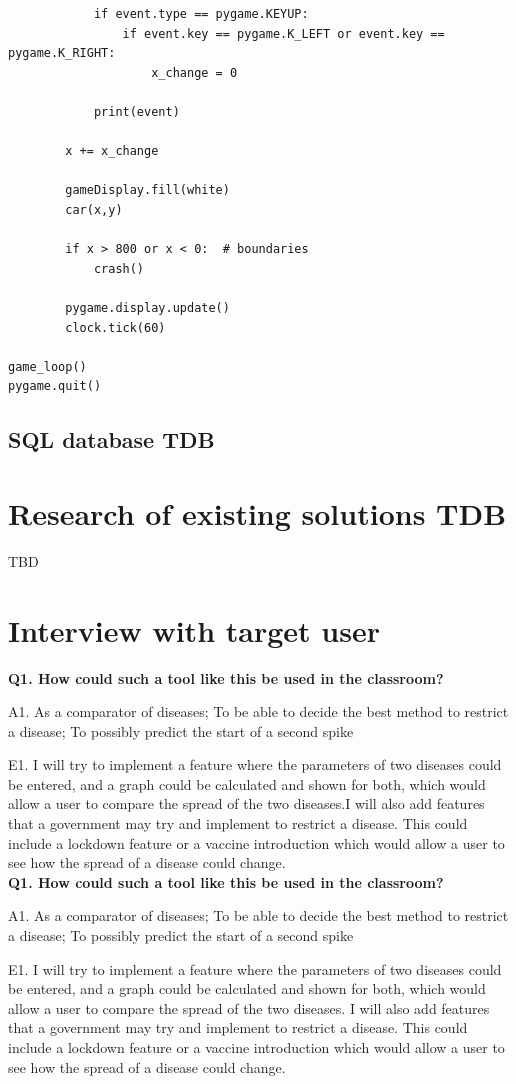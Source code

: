 \documentclass[11pt, a4paper]{article}
\begin{document}
\begin{lstlisting}
            if event.type == pygame.KEYUP:
                if event.key == pygame.K_LEFT or event.key == pygame.K_RIGHT:
                    x_change = 0

            print(event)

        x += x_change

        gameDisplay.fill(white)
        car(x,y)

        if x > 800 or x < 0:  # boundaries
            crash()

        pygame.display.update()
        clock.tick(60)

game_loop()
pygame.quit()
\end{lstlisting}


\subsection{SQL database TDB}

\newpage
\section{Research of existing solutions TDB}
TBD
\newpage


\section{Interview with target user}
\textbf{Q1. How could such a tool like this be used in the classroom?}

A1. As a comparator of diseases; To be able to decide the best method to restrict a disease; To possibly predict the start of a second spike

E1. I will try to implement a feature where the parameters of two diseases could be entered, and a graph could be calculated and shown for both, which would allow a user to compare the spread of the two diseases.I will also add features that a government may try and implement to restrict a disease. This could include a lockdown feature or a vaccine introduction which would allow a user to see how the spread of a disease could change.
\\

\textbf{Q1. How could such a tool like this be used in the classroom?}

A1. As a comparator of diseases; To be able to decide the best method to restrict a disease; To possibly predict the start of a second spike

E1. I will try to implement a feature where the parameters of two diseases could be entered, and a graph could be calculated and shown for both, which would allow a user to compare the spread of the two diseases. I will also add features that a government may try and implement to restrict a disease. This could include a lockdown feature or a vaccine introduction which would allow a user to see how the spread of a disease could change.
\end{document}
